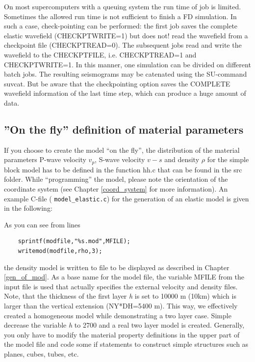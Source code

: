 \documentclass[11pt,onecolumn,oneside]{article}
\begin{document}
On most supercomputers with a queuing system the run time of job is limited. Sometimes the allowed run time is not sufficient to finish a FD simulation. In such a case, check-pointing can be performed: the first job saves the complete elastic wavefield (CHECKPTWRITE=1) but does not! read the wavefield from a checkpoint file (CHECKPTREAD=0). The subsequent jobs read and write the wavefield to the CHECKPTFILE, i.e. CHECKPTREAD=1 and CHECKPTWRITE=1. In this manner, one simulation can be divided on different batch jobs. The resulting seismograms may be catenated using the SU-command suvcat. But be aware that the checkpointing option saves the COMPLETE wavefield information of the last time step, which can produce a huge amount of data.

\subsection{''On the fly'' definition of material parameters}
\label{model_def_func}
If you choose to create the model ``on the fly'', the distribution of the
material parameters P-wave velocity $v_p$, S-wave velocity $v-s$ and density
$\rho$ for the simple block model has to be defined in the function hh.c that
can be found in the src folder. While ``programming'' the model, please note
the orientation of the coordinate system (see Chapter \ref{coord_system} for
more information). An example C-file ( \lstinline{model_elastic.c}) for the
generation of an elastic model is given in the following:



As you can see from lines
\begin{verbatim}
    sprintf(modfile,"%s.mod",MFILE);
    writemod(modfile,rho,3);
\end{verbatim}
the density model is written to file to be displayed as described in Chapter \ref{gen_of_mod}. As a base name for the model file, the variable MFILE from the input file is used that actually specifies the external velocity and density files. Note, that the thickness of the first layer \textit{h} is set to 10000 m (10km) which is larger than the vertical extension (NY*DH=5400 m). This way, we effectively created a homogeneous model while demonstrating a two layer case. Simple decrease the variable \textit{h} to 2700 and a real two layer model is created. Generally, you only have to modify the material property definitions in the upper part of the model file and code some if statements to construct simple structures such as planes, cubes, tubes, etc.
\end{document}
